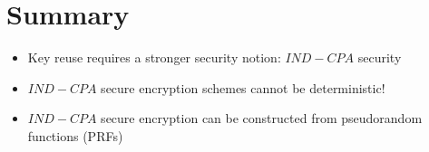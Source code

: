 \section{Summary}
	\begin{itemize}
		\item Key reuse requires a stronger security notion: $IND-CPA$ security
		\item $IND-CPA$ secure encryption schemes cannot be deterministic!
		\item $IND-CPA$ secure encryption can be constructed from pseudorandom functions (PRFs)
	\end{itemize}




































